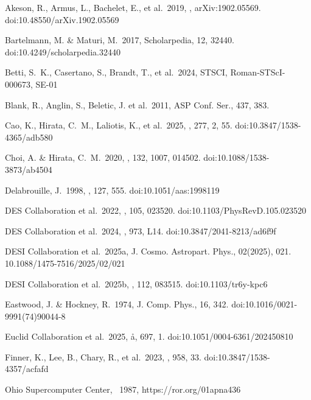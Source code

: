 \documentclass[]{pasj01}
\begin{document}
\begin{thebibliography}{} %

 Akeson, R., Armus, L., Bachelet, E., et al.\ 2019, , arXiv:1902.05569. doi:10.48550/arXiv.1902.05569

 Bartelmann, M. \& Maturi, M.\ 2017, Scholarpedia, 12, 32440. doi:10.4249/scholarpedia.32440

 Betti, S.~K., Casertano, S., Brandt, T., et al.\ 2024, STSCI, Roman-STScI-000673, SE-01

 Blank, R., Anglin, S., Beletic, J. et al.\ 2011, ASP Conf. Ser., 437, 383.

 Cao, K., Hirata, C.~M., Laliotis, K., et al.\ 2025, \apjs, 277, 2, 55. doi:10.3847/1538-4365/adb580

 Choi, A. \& Hirata, C.~M.\ 2020, \pasp, 132, 1007, 014502. doi:10.1088/1538-3873/ab4504

 Delabrouille, J.\ 1998, \aaps, 127, 555. doi:10.1051/aas:1998119

 DES Collaboration et al.\ 2022, \prd, 105, 023520. doi:10.1103/PhysRevD.105.023520

 DES Collaboration et al.\ 2024, \apjl, 973, L14. doi:10.3847/2041-8213/ad6f9f

 DESI Collaboration et al.\ 2025a, J. Cosmo. Astropart. Phys., 02(2025), 021. 10.1088/1475-7516/2025/02/021

 DESI Collaboration et al.\ 2025b, \prd, 112, 083515. doi:10.1103/tr6y-kpc6

 Eastwood, J. \& Hockney, R.\ 1974, J. Comp. Phys., 16, 342. doi:10.1016/0021-9991(74)90044-8

 Euclid Collaboration et al.\ 2025, \aa, 697, 1. doi:10.1051/0004-6361/202450810

 Finner, K., Lee, B., Chary, R., et al.\ 2023, \apj, 958, 33. doi:10.3847/1538-4357/acfafd

 Ohio Supercomputer Center, \ 1987, https://ror.org/01apna436


\end{thebibliography}
\end{document}
